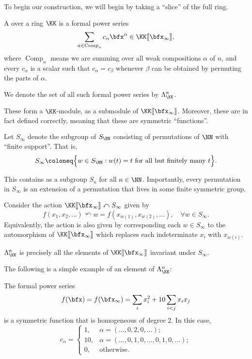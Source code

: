 \documentclass{article}
\newcommand{\lrBrack}[1]{[\kern-1.2pt[ {#1} ]\kern-1.2pt]}
\newcommand{\fps}[2]{#1 \lrBrack{#2}}
\DeclareMathOperator{\Com}{Comp}
\begin{document}
To begin our construction, we will begin by taking a ``slice'' of the full ring.

\begin{definition}
    A  over a ring $\KK$ is a formal power series
    \[
        \sum_{\alpha \in \Com_n}
        c_\alpha \bfx^\alpha
        \in \fps{\KK}{\bfx_\infty},
    \]
    where $\Com_n$ means we are summing over all weak compositions $\alpha$ of $n$, and every $c_\alpha$ is a scalar such that $c_\alpha = c_\beta$ whenever $\beta$ can be obtained by permuting the parts of $\alpha$.
    
    We denote the set of all such formal power series by $\Lambda_\KK^n$.
\end{definition}

These form a $\KK$-module, as a submodule of $\fps{\KK}{\bfx_\infty}$.
Moreover, these are in fact defined correctly, meaning that these are symmetric ``functions''.

\begin{definition}
    Let $S_\infty$ denote the subgroup of $S_\NN$ consisting of permutations of $\NN$ with ``finite support''.
    That is,
    \[
        S_\infty
        \coloneq
        \Big\{
            w \in S_\NN: w(t) = t\text{ for all but finitely many }t
        \Big\}.
    \]
\end{definition}

This contains as a subgroup $S_n$ for all $n \in \NN$.
Importantly, every permutation in $S_\infty$ is an extension of a permutation that lives in some finite symmetric group.

\begin{remark}
    Consider the action $\KK\lrBrack{\bfx_\infty} \curvearrowleft S_\infty$ given by
    \[
        f(x_1,x_2,\ldots) \curvearrowleft w
        =
        f(x_{w(1)},x_{w(2)},\ldots), \quad \forall w \in S_\infty.
    \]
    Equivalently, the action is also given by corresponding each $w \in S_\infty$ to the automorphism of $\fps{\KK}{\bfx_\infty}$ which replaces each indeterminate $x_i$ with $x_{w(i)}$.

    $\Lambda_{\KK}^n$ is precisely all the elements of $\fps{\KK}{\bfx_\infty}$ invariant under $S_\infty$.
\end{remark}

The following is a simple example of an element of $\Lambda_\KK^n$:

\begin{example}
    The formal power series 
    \[
        f(\bfx)
        =
        f(\bfx_\infty)
        =
        \sum_i
        x_i^2 
        + 10\sum_{i < j}
        x_ix_j
    \]
    is a symmetric function that is homogeneous of degree $2$. In this case, 
    \[
        c_\alpha
        =
        \begin{cases}
            1,
            & \alpha = (\ldots,0,2,0,\ldots); \\
            10,
            & \alpha = (\ldots,0,1,0,\ldots,0,1,0,\ldots); \\
            0,
            & \text{otherwise}.
        \end{cases}
    \]
\end{example}
\end{document}
